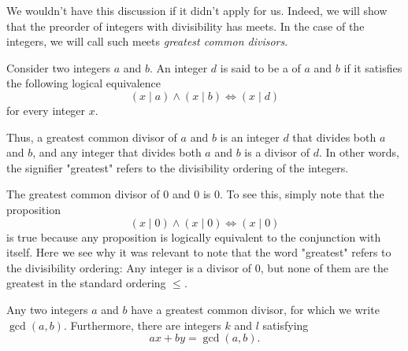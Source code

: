 We wouldn't have this discussion if it didn't apply for us. Indeed, we will show that the preorder of integers with divisibility has meets. In the case of the integers, we will call such meets \emph{greatest common divisors}.

\begin{definition}
  Consider two integers $a$ and $b$. An integer $d$ is said to be a  of $a$ and $b$ if it satisfies the following logical equivalence
  \begin{equation*}
    (x\mid a)\land(x\mid b) \Leftrightarrow (x\mid d)
  \end{equation*}
  for every integer $x$.
\end{definition}

Thus, a greatest common divisor of $a$ and $b$ is an integer $d$ that divides both $a$ and $b$, and any integer that divides both $a$ and $b$ is a divisor of $d$. In other words, the signifier "greatest" refers to the divisibility ordering of the integers.

\begin{example}
  The greatest common divisor of $0$ and $0$ is $0$. To see this, simply note that the proposition
  \begin{equation*}
    (x\mid 0)\land(x\mid 0) \Leftrightarrow (x\mid 0)
  \end{equation*}
  is true because any proposition is logically equivalent to the conjunction with itself. Here we see why it was relevant to note that the word "greatest" refers to the divisibility ordering: Any integer is a divisor of $0$, but none of them are the greatest in the standard ordering $\leq$.
\end{example}

\begin{theorem}\label{theorem:definition-gcd}
  Any two integers $a$ and $b$ have a greatest common divisor, for which we write $\gcd(a,b)$. Furthermore, there are integers $k$ and $l$ satisfying 
  \begin{equation*}
    ax+by = \gcd(a,b).
  \end{equation*}
\end{theorem}


